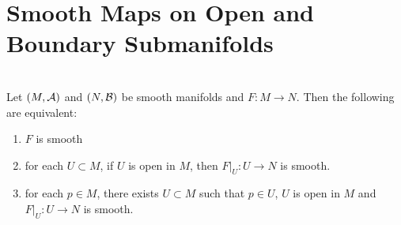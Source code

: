\documentclass{book}
\begin{document}
\newpage 
\section{Smooth Maps on Open and Boundary Submanifolds}



\begin{ex}   \\
	Let $(M, \mathcal{A})$ and $(N, \mathcal{B})$ be smooth manifolds and $F: M \rightarrow N$. Then the following are equivalent: 
	\begin{enumerate}
		\item $F$ is smooth
		\item for each $U \subset M$, if $U$ is open in $M$, then $F|_U: U \rightarrow N$ is smooth.
		\item for each $p \in M$, there exists $U \subset M$ such that $p \in U$, $U$ is open in $M$ and $F|_U: U \rightarrow N$ is smooth. 
	\end{enumerate}
\end{ex}
\end{document}
